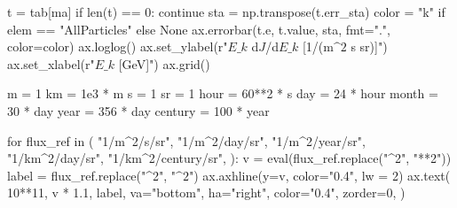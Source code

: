 \documentclass[
  letterpaper,
  DIV=11,
  numbers=noendperiod]{scrreprt}
\newenvironment{Shaded}{\begin{snugshade}}{\end{snugshade}}
\newcommand{\BuiltInTok}[1]{\textcolor[rgb]{0.00,0.23,0.31}{#1}}
\newcommand{\ControlFlowTok}[1]{\textcolor[rgb]{0.00,0.23,0.31}{#1}}
\newcommand{\DecValTok}[1]{\textcolor[rgb]{0.68,0.00,0.00}{#1}}
\newcommand{\FloatTok}[1]{\textcolor[rgb]{0.68,0.00,0.00}{#1}}
\newcommand{\KeywordTok}[1]{\textcolor[rgb]{0.00,0.23,0.31}{#1}}
\newcommand{\NormalTok}[1]{\textcolor[rgb]{0.00,0.23,0.31}{#1}}
\newcommand{\OperatorTok}[1]{\textcolor[rgb]{0.37,0.37,0.37}{#1}}
\newcommand{\StringTok}[1]{\textcolor[rgb]{0.13,0.47,0.30}{#1}}
\newcommand{\VariableTok}[1]{\textcolor[rgb]{0.07,0.07,0.07}{#1}}
\newcommand{\VerbatimStringTok}[1]{\textcolor[rgb]{0.13,0.47,0.30}{#1}}
\begin{document}
\begin{Shaded}
\begin{Highlighting}[]
\NormalTok{    t }\OperatorTok{=}\NormalTok{ tab[ma]}
    \ControlFlowTok{if} \BuiltInTok{len}\NormalTok{(t) }\OperatorTok{==} \DecValTok{0}\NormalTok{:}
        \ControlFlowTok{continue}
\NormalTok{    sta }\OperatorTok{=}\NormalTok{ np.transpose(t.err\_sta)}
\NormalTok{    color }\OperatorTok{=} \StringTok{"k"} \ControlFlowTok{if}\NormalTok{ elem }\OperatorTok{==} \StringTok{"AllParticles"} \ControlFlowTok{else} \VariableTok{None}
\NormalTok{    ax.errorbar(t.e, t.value, sta, fmt}\OperatorTok{=}\StringTok{"."}\NormalTok{, color}\OperatorTok{=}\NormalTok{color)}
\NormalTok{ax.loglog()}
\NormalTok{ax.set\_ylabel(}\VerbatimStringTok{r"$E\_k$ d$J$/d$E\_k$ [1/(m$\^{}2$ s sr)]"}\NormalTok{)}
\NormalTok{ax.set\_xlabel(}\VerbatimStringTok{r"$E\_k$ [GeV]"}\NormalTok{)}
\NormalTok{ax.grid()}

\NormalTok{m }\OperatorTok{=} \DecValTok{1}
\NormalTok{km }\OperatorTok{=} \FloatTok{1e3} \OperatorTok{*}\NormalTok{ m}
\NormalTok{s }\OperatorTok{=} \DecValTok{1}
\NormalTok{sr }\OperatorTok{=} \DecValTok{1}
\NormalTok{hour }\OperatorTok{=} \DecValTok{60}\OperatorTok{**}\DecValTok{2} \OperatorTok{*}\NormalTok{ s}
\NormalTok{day }\OperatorTok{=} \DecValTok{24} \OperatorTok{*}\NormalTok{ hour}
\NormalTok{month }\OperatorTok{=} \DecValTok{30} \OperatorTok{*}\NormalTok{ day}
\NormalTok{year }\OperatorTok{=} \DecValTok{356} \OperatorTok{*}\NormalTok{ day}
\NormalTok{century }\OperatorTok{=} \DecValTok{100} \OperatorTok{*}\NormalTok{ year}

\ControlFlowTok{for}\NormalTok{ flux\_ref }\KeywordTok{in}\NormalTok{ (}
        \StringTok{"1/m\^{}2/s/sr"}\NormalTok{,}
        \StringTok{"1/m\^{}2/day/sr"}\NormalTok{,}
        \StringTok{"1/m\^{}2/year/sr"}\NormalTok{,}
        \StringTok{"1/km\^{}2/day/sr"}\NormalTok{,}
        \StringTok{"1/km\^{}2/century/sr"}\NormalTok{,}
\NormalTok{    ):}
\NormalTok{        v }\OperatorTok{=} \BuiltInTok{eval}\NormalTok{(flux\_ref.replace(}\StringTok{"\^{}2"}\NormalTok{, }\StringTok{"**2"}\NormalTok{))}
\NormalTok{        label }\OperatorTok{=}\NormalTok{ flux\_ref.replace(}\StringTok{"\^{}2"}\NormalTok{, }\StringTok{"$\^{}2$"}\NormalTok{)}
\NormalTok{        ax.axhline(y}\OperatorTok{=}\NormalTok{v, color}\OperatorTok{=}\StringTok{"0.4"}\NormalTok{, lw }\OperatorTok{=} \DecValTok{2}\NormalTok{)}
\NormalTok{        ax.text(}
                \DecValTok{10}\OperatorTok{**}\DecValTok{11}\NormalTok{,}
\NormalTok{                v }\OperatorTok{*} \FloatTok{1.1}\NormalTok{,}
\NormalTok{                label,}
\NormalTok{                va}\OperatorTok{=}\StringTok{"bottom"}\NormalTok{,}
\NormalTok{                ha}\OperatorTok{=}\StringTok{"right"}\NormalTok{,}
\NormalTok{                color}\OperatorTok{=}\StringTok{"0.4"}\NormalTok{,}
\NormalTok{                zorder}\OperatorTok{=}\DecValTok{0}\NormalTok{,}
\NormalTok{            )}
\end{Highlighting}
\end{Shaded}
\end{document}
